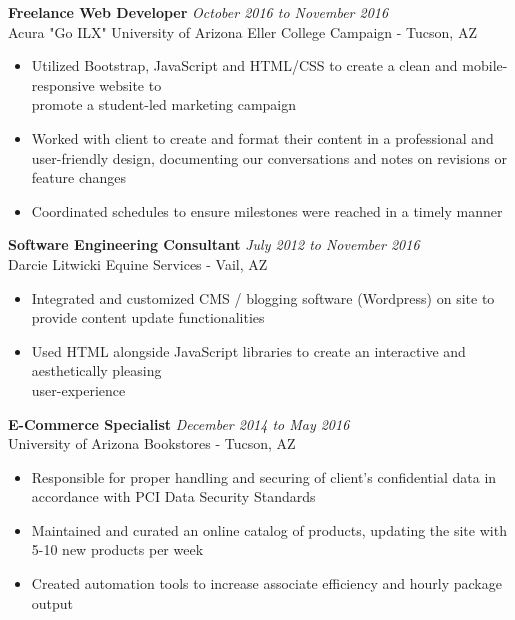 \documentclass[10pt]{res} %
\begin{document}
\begin{resume}
  {\bf Freelance Web Developer} \hfill  {\sl October 2016 to November 2016}\\
  Acura "Go ILX" University of Arizona Eller College Campaign - Tucson, AZ
  
   \begin{itemize} %
   \item Utilized Bootstrap, JavaScript and HTML/CSS to create a clean and mobile-responsive website to \\ promote a student-led marketing campaign
   \item Worked with client to create and format their content in a professional and user-friendly design, documenting our conversations and notes on revisions or feature changes
   \item Coordinated schedules to ensure milestones were reached in a timely manner
   \end{itemize}

  {\bf Software Engineering Consultant} \hfill  {\sl July 2012 to November 2016}\\
  Darcie Litwicki Equine Services - Vail, AZ
  
   \begin{itemize} %
   \item Integrated and customized CMS / blogging software (Wordpress) on site to provide content update functionalities
   \item Used HTML alongside JavaScript libraries to create an interactive and aesthetically pleasing \\ user-experience
   \end{itemize}
   
   
  {\bf E-Commerce Specialist} \hfill  {\sl December 2014 to May 2016}\\
  University of Arizona Bookstores - Tucson, AZ
  
   \begin{itemize} %
   \item Responsible for proper handling and securing of client’s confidential data in accordance with PCI Data Security Standards
   \item Maintained and curated an online catalog of products, updating the site with 5-10 new products per week
   \item Created automation tools to increase associate efficiency and hourly package output
   \end{itemize}
 

\end{resume}
\end{document}
